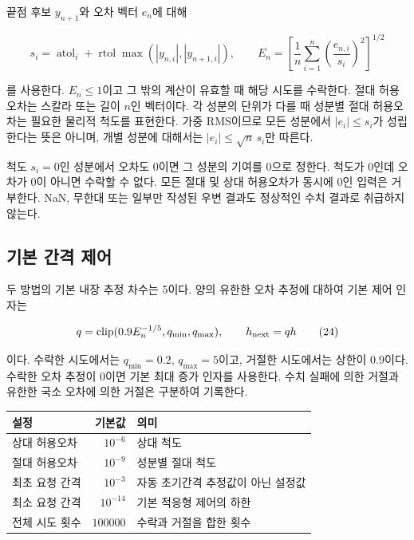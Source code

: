 \documentclass[
  10pt,
  dvipsnames]{article}
\begin{document}
끝점 후보 \(y_{n+1}\)와 오차 벡터 \(e_n\)에 대해

\[
 s_i=\operatorname{atol}_i+\operatorname{rtol}
       \max(|y_{n,i}|,|y_{n+1,i}|),\qquad
 E_n=\left[\frac1n\sum_{i=1}^n\left(\frac{e_{n,i}}{s_i}\right)^2\right]^{1/2}
 \tag{23}
\]

를 사용한다. \(E_n\le1\)이고 그 밖의 계산이 유효할 때 해당 시도를
수락한다. 절대 허용오차는 스칼라 또는 길이 \(n\)인 벡터이다. 각 성분의
단위가 다를 때 성분별 절대 허용오차는 필요한 물리적 척도를 표현한다.
가중 RMS이므로 모든 성분에서 \(|e_i|\le s_i\)가 성립한다는 뜻은 아니며,
개별 성분에 대해서는 \(|e_i|\le\sqrt n\,s_i\)만 따른다.

척도 \(s_i=0\)인 성분에서 오차도 0이면 그 성분의 기여를 0으로 정한다.
척도가 0인데 오차가 0이 아니면 수락할 수 없다. 모든 절대 및 상대
허용오차가 동시에 0인 입력은 거부한다. NaN, 무한대 또는 일부만 작성된
우변 결과도 정상적인 수치 결과로 취급하지 않는다.

\hypertarget{uxae30uxbcf8-uxac04uxaca9-uxc81cuxc5b4}{%
\subsection{기본 간격
제어}\label{uxae30uxbcf8-uxac04uxaca9-uxc81cuxc5b4}}

두 방법의 기본 내장 추정 차수는 5이다. 양의 유한한 오차 추정에 대하여
기본 제어 인자는

\[
 q=\operatorname{clip}(0.9 E_n^{-1/5},q_{\min},q_{\max}),
 \qquad h_{\rm next}=q h
 \tag{24}
\]

이다. 수락한 시도에서는 \(q_{\min}=0.2\), \(q_{\max}=5\)이고, 거절한
시도에서는 상한이 \(0.9\)이다. 수락한 오차 추정이 0이면 기본 최대 증가
인자를 사용한다. 수치 실패에 의한 거절과 유한한 국소 오차에 의한 거절은
구분하여 기록한다.

\begin{longtable}[]{@{}lrl@{}}
\toprule\noalign{}
설정 & 기본값 & 의미 \\
\midrule\noalign{}
\endhead
\bottomrule\noalign{}
\endlastfoot
상대 허용오차 & \(10^{-6}\) & 상대 척도 \\
절대 허용오차 & \(10^{-9}\) & 성분별 절대 척도 \\
최초 요청 간격 & \(10^{-3}\) & 자동 초기간격 추정값이 아닌 설정값 \\
최소 요청 간격 & \(10^{-14}\) & 기본 적응형 제어의 하한 \\
전체 시도 횟수 & \(100000\) & 수락과 거절을 합한 횟수 \\
\end{longtable}
\end{document}
